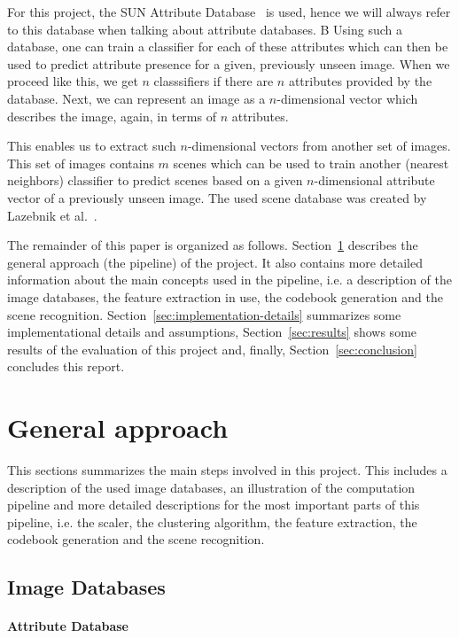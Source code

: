 \documentclass{vldb}
\begin{document}
For this project, the SUN Attribute Database~\cite{Patterson:2012} is used, hence
we will always refer to this database when talking about attribute databases.
B
Using such a database, one can train a classifier for each of these attributes
which can then be used to predict attribute presence for a given, previously
unseen image. When we proceed like this, we get $n$ classsifiers if there are $n$
attributes provided by the database. Next, we can represent an image as a
$n$-dimensional vector which describes the image, again, in terms of $n$
attributes.

This enables us to extract such $n$-dimensional vectors from another set of
images. This set of images contains $m$ scenes which can be used to train another
(nearest neighbors) classifier to predict scenes based on a given $n$-dimensional
attribute vector of a previously unseen image. The used scene database was created
by Lazebnik et al.~\cite{Lazebnik:2006}.

The remainder of this paper is organized as follows.
Section~\ref{sec:general-approach} describes the general approach (the pipeline)
of the project. It also contains more detailed information about the main
concepts used in the pipeline, i.e. a description of the image databases, the
feature extraction in use, the codebook generation and the scene recognition.
Section~\ref{sec:implementation-details} summarizes some implementational
details and assumptions, Section~\ref{sec:results} shows some results of the
evaluation of this project and, finally, Section~\ref{sec:conclusion} concludes
this report.

\section{General approach}
\label{sec:general-approach}

This sections summarizes the main steps involved in this project. This includes
a description of the used image databases, an illustration of the computation
pipeline and more detailed descriptions for the most important parts of this
pipeline, i.e. the scaler, the clustering algorithm, the feature extraction, the
codebook generation and the scene recognition.

\subsection{Image Databases}
\label{subsec:image-databases}

\paragraph*{Attribute Database}
\label{par:attribute-database}
\end{document}
